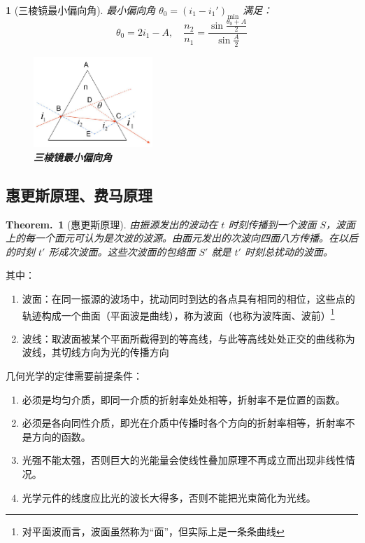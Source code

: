 \documentclass[UTF8]{report}
\theoremstyle{MyLineTheoremStyle} %
\newtheorem{LineTheorem}{Theorem.\,}
\theoremstyle{MyBlockTheoremStyle} %
\theoremstyle{MySubsubsectionStyle} %
\newtheorem{definition}{}
\begin{document}
\begin{definition}[三棱镜最小偏向角]

最小偏向角 $\theta_0 = (i_1 - i_1')_{\text{min}}$ 满足：
\begin{equation}
    \theta_0 = 2i_1 - A, \quad \frac{n_2}{n_1} = \frac{\sin\frac{\theta_0+A}2}{\sin\frac A2}
\end{equation}

\begin{figure}[H]\centering
\includegraphics[width=0.4\textwidth]{assets/image (45).jpg}
\caption{\textbf{三棱镜最小偏向角}}\label{三棱镜最小偏向角}
\end{figure}

\end{definition}

\subsection{惠更斯原理、费马原理}

\begin{LineTheorem}[惠更斯原理]\label{LineTheorem: 惠更斯原理}
    由振源发出的波动在 $t$ 时刻传播到一个波面 $S$，波面上的每一个面元可认为是次波的波源。由面元发出的次波向四面八方传播。在以后的时刻 $t'$ 形成次波面。这些次波面的包络面 $S'$ 就是 $t'$ 时刻总扰动的波面。
\end{LineTheorem}

\noindent 其中：
\begin{enumerate}
    \item 波面：在同一振源的波场中，扰动同时到达的各点具有相同的相位，这些点的轨迹构成一个曲面（平面波是曲线），称为波面（也称为波阵面、波前）\footnote{对平面波而言，波面虽然称为“面”，但实际上是一条条曲线}
    \item 波线：取波面被某个平面所截得到的等高线，与此等高线处处正交的曲线称为波线，其切线方向为光的传播方向
\end{enumerate}

\noindent 几何光学的定律需要前提条件：
\begin{enumerate}
\item 必须是均匀介质，即同一介质的折射率处处相等，折射率不是位置的函数。
\item 必须是各向同性介质，即光在介质中传播时各个方向的折射率相等，折射率不是方向的函数。
\item 光强不能太强，否则巨大的光能量会使线性叠加原理不再成立而出现非线性情况。
\item 光学元件的线度应比光的波长大得多，否则不能把光束简化为光线。
\end{enumerate}
\end{document}
